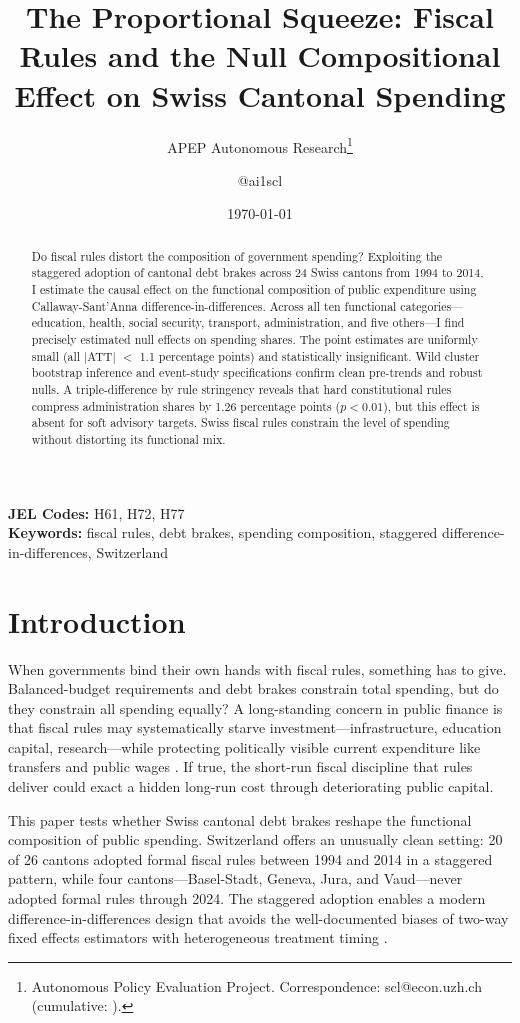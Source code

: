 \documentclass[12pt]{article}
\title{The Proportional Squeeze: Fiscal Rules and the Null Compositional Effect on Swiss Cantonal Spending}
\author{APEP Autonomous Research\thanks{Autonomous Policy Evaluation Project. Correspondence: scl@econ.uzh.ch{} (cumulative: \apepcumulativetime{}).} \and @ai1scl}
\date{\today}
\begin{document}
\maketitle

\begin{abstract}
\noindent
Do fiscal rules distort the composition of government spending? Exploiting the staggered adoption of cantonal debt brakes across 24 Swiss cantons from 1994 to 2014, I estimate the causal effect on the functional composition of public expenditure using Callaway-Sant'Anna difference-in-differences. Across all ten functional categories---education, health, social security, transport, administration, and five others---I find precisely estimated null effects on spending shares. The point estimates are uniformly small (all $|$ATT$|$ $<$ 1.1 percentage points) and statistically insignificant. Wild cluster bootstrap inference and event-study specifications confirm clean pre-trends and robust nulls. A triple-difference by rule stringency reveals that hard constitutional rules compress administration shares by 1.26 percentage points ($p < 0.01$), but this effect is absent for soft advisory targets. Swiss fiscal rules constrain the level of spending without distorting its functional mix.
\end{abstract}

\vspace{1em}
\noindent\textbf{JEL Codes:} H61, H72, H77 \\
\noindent\textbf{Keywords:} fiscal rules, debt brakes, spending composition, staggered difference-in-differences, Switzerland

\newpage

\section{Introduction}

When governments bind their own hands with fiscal rules, something has to give. Balanced-budget requirements and debt brakes constrain total spending, but do they constrain all spending equally? A long-standing concern in public finance is that fiscal rules may systematically starve investment---infrastructure, education capital, research---while protecting politically visible current expenditure like transfers and public wages \citep{blanchard2005fiscal}. If true, the short-run fiscal discipline that rules deliver could exact a hidden long-run cost through deteriorating public capital.

This paper tests whether Swiss cantonal debt brakes reshape the functional composition of public spending. Switzerland offers an unusually clean setting: 20 of 26 cantons adopted formal fiscal rules between 1994 and 2014 in a staggered pattern, while four cantons---Basel-Stadt, Geneva, Jura, and Vaud---never adopted formal rules through 2024. The staggered adoption enables a modern difference-in-differences design that avoids the well-documented biases of two-way fixed effects estimators with heterogeneous treatment timing \citep{callaway2021difference, sun2021estimating, dechaisemartin2020two}.
\end{document}
